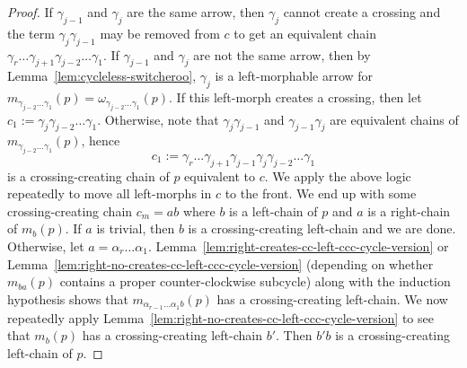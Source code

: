 \documentclass{article}
\theoremstyle{definition}
\begin{document}
\begin{proof}
	If $\gamma_{j-1}$ and $\gamma_j$ are the same arrow, then $\gamma_j$ cannot create a crossing and the term $\gamma_{j}\gamma_{j-1}$ may be removed from $c$ to get an equivalent chain $\gamma_r\dots\gamma_{j+1}\gamma_{j-2}\dots\gamma_1$. 
	If $\gamma_{j-1}$ and $\gamma_j$ are not the same arrow, then by Lemma~\ref{lem:cycleless-switcheroo},
	$\gamma_j$ is a left-morphable arrow for 
	$m_{\gamma_{j-2}\dots\gamma_1}(p)=\omega_{\gamma_{j-2}\dots\gamma_1}(p)$. If this left-morph creates a crossing, then let 
	$c_1:=\gamma_j\gamma_{j-2}\dots\gamma_1$. Otherwise, note that $\gamma_j\gamma_{j-1}$ and $\gamma_{j-1}\gamma_{j}$ are equivalent chains of 
	$m_{\gamma_{j-2}\dots\gamma_1}(p)$, hence 	
	\[c_1:=\gamma_r\dots\gamma_{j+1}\gamma_{j-1}\gamma_j\gamma_{j-2}\dots\gamma_1\]
	is a crossing-creating chain of $p$ equivalent to $c$.
	We apply the above logic repeatedly to move all left-morphs in $c$ to the front. We end up with some crossing-creating chain $c_m=ab$ where $b$ is a left-chain of $p$ and $a$ is a right-chain of $m_b(p)$. If $a$ is trivial, then $b$ is a crossing-creating left-chain and we are done. 
	Otherwise, let $a=\alpha_r\dots\alpha_1$.
	Lemma~\ref{lem:right-creates-cc-left-ccc-cycle-version} or Lemma~\ref{lem:right-no-creates-cc-left-ccc-cycle-version} (depending on whether $m_{ba}(p)$ contains a proper counter-clockwise subcycle) along with the induction hypothesis shows that 
	$m_{\alpha_{r-1}\dots\alpha_1b}(p)$ has a crossing-creating left-chain. We now repeatedly apply Lemma~\ref{lem:right-no-creates-cc-left-ccc-cycle-version} to see that $m_b(p)$ has a crossing-creating left-chain $b'$. Then $b'b$ is a crossing-creating left-chain of $p$.



\end{proof}
\end{document}
